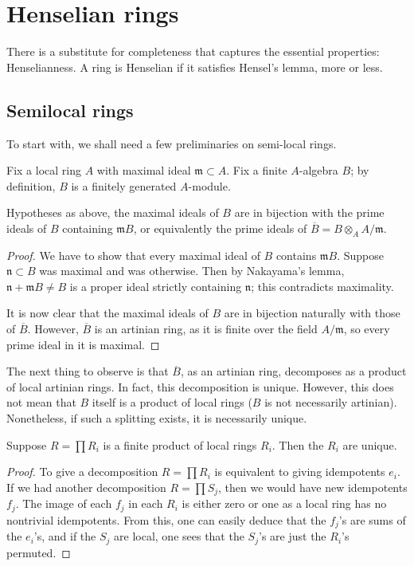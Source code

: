 \section{Henselian rings}



There is a substitute for completeness that captures the essential
properties: Henselianness. A ring is Henselian if it satisfies
Hensel's lemma, more or less.

\subsection{Semilocal rings}

To start with, we shall need a few preliminaries on semi-local rings.

Fix a local ring $A$ with maximal ideal $\mathfrak{m} \subset A$.
Fix a finite $A$-algebra $B$; by definition, $B $ is a finitely
generated $A$-module.

\begin{proposition} 
Hypotheses as above, the maximal ideals of $B$ are in bijection with
the prime ideals of $B $ containing $\mathfrak{m} B$, or equivalently
the prime ideals of $\overline{B} = B \otimes_A A/\mathfrak{m}$.
\end{proposition}

\begin{proof} 
We have to show that every maximal ideal of $B$ contains $\mathfrak{m}
B$. Suppose $\mathfrak{n} \subset B$ was maximal and was otherwise.
Then by Nakayama's lemma, $\mathfrak{n} + \mathfrak{m} B \neq B$ is a
proper ideal strictly containing $\mathfrak{n}$; this contradicts
maximality.

It is now clear that the maximal ideals of $B$ are in bijection
naturally with those of $\overline{B}$. 
However, $\overline{B}$ is an artinian ring, as it is finite over the
field $A/\mathfrak{m}$, so every prime ideal in it is maximal.
\end{proof}



The next thing to observe is that $\overline{B}$, as an artinian ring,
decomposes  as a product of local artinian rings.
In fact, this decomposition is unique.
However, this does not mean that $B$ itself 
is a product of local rings ($B$ is not necessarily artinian).
Nonetheless, if such a splitting exists, it is necessarily unique.

\begin{proposition} 
Suppose $R = \prod R_i$ is a finite product of local rings $R_i$. Then
the $R_i$ are unique.
\end{proposition}
\begin{proof} 
To give a decomposition $R = \prod R_i$ is equivalent to giving
idempotents $e_i$. If we had another decomposition $R = \prod S_j$,
then we would have new idempotents $f_j$. The image of each $f_j$ in
each $R_i$ is either zero or one as a local ring has no nontrivial
idempotents. From this, one can easily deduce that the $f_j$'s are
sums of the $e_i$'s, and if the $S_j$ are local, one sees that the
$S_j$'s are just the $R_i$'s permuted. 
\end{proof}

